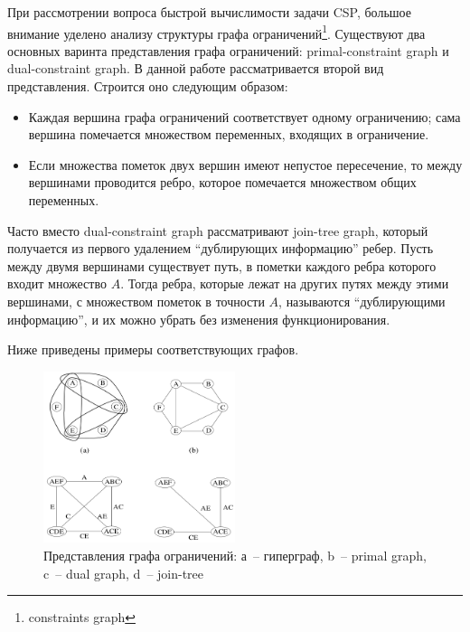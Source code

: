 \documentclass[12pt]{article}
\begin{document}
При рассмотрении вопроса быстрой вычислимости задачи CSP, большое внимание уделено анализу структуры графа ограничений\footnote{constraints graph}.
Существуют два основных варинта представления графа ограничений: primal-constraint graph и dual-constraint graph\cite{CSP10}. 
В данной работе рассматривается второй вид представления. Строится оно следующим образом: 
\begin{itemize}
\item Каждая вершина графа ограничений соответствует одному ограничению; сама вершина помечается множеством переменных, 
входящих в ограничение.
\item Если множества пометок двух вершин имеют непустое пересечение, то между вершинами проводится ребро, которое помечается 
множеством общих переменных.
\end{itemize}

Часто вместо dual-constraint graph рассматривают join-tree graph, который получается из первого удалением 
``дублирующих информацию'' ребер. Пусть между двумя вершинами существует путь, 
в пометки каждого ребра которого входит множество $A$. Тогда ребра, которые лежат на других путях между этими вершинами, 
с множеством пометок в точности $A$, называются ``дублирующими информацию'', и их можно убрать без изменения функционирования. 

Ниже приведены примеры соответствующих графов.

\begin{figure}[htb]
\centering
\includegraphics[width=0.50\textwidth]{constraint_graph.png}
\caption{Представления графа ограничений: а~-- гиперграф, b~-- primal graph, c~-- dual graph, d~-- join-tree }
\label{fig:constraint_graph}
\end{figure}
\end{document}
